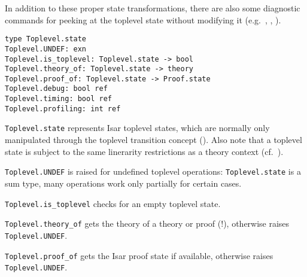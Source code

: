\begin{isabellebody}
\begin{isamarkuptext}
  In addition to these proper state transformations, there are also
  some diagnostic commands for peeking at the toplevel state without
  modifying it (e.g.\ , ,
  ).%
\end{isamarkuptext}%
\isamarkuptrue%
%
\isadelimmlref
%
\endisadelimmlref
%
\isatagmlref
%
\begin{isamarkuptext}%
\begin{mldecls}
  \verb|type Toplevel.state| \\
  \verb|Toplevel.UNDEF: exn| \\
  \verb|Toplevel.is_toplevel: Toplevel.state -> bool| \\
  \verb|Toplevel.theory_of: Toplevel.state -> theory| \\
  \verb|Toplevel.proof_of: Toplevel.state -> Proof.state| \\
  \verb|Toplevel.debug: bool ref| \\
  \verb|Toplevel.timing: bool ref| \\
  \verb|Toplevel.profiling: int ref| \\
  \end{mldecls}

  \begin{description}

  \item \verb|Toplevel.state| represents Isar toplevel states,
  which are normally only manipulated through the toplevel transition
  concept ().  Also note that a
  toplevel state is subject to the same linerarity restrictions as a
  theory context (cf.~).

  \item \verb|Toplevel.UNDEF| is raised for undefined toplevel
  operations: \verb|Toplevel.state| is a sum type, many operations
  work only partially for certain cases.

  \item \verb|Toplevel.is_toplevel| checks for an empty toplevel state.

  \item \verb|Toplevel.theory_of| gets the theory of a theory or proof
  (!), otherwise raises \verb|Toplevel.UNDEF|.

  \item \verb|Toplevel.proof_of| gets the Isar proof state if
  available, otherwise raises \verb|Toplevel.UNDEF|.


\end{description}
\end{isamarkuptext}
\end{isabellebody}
